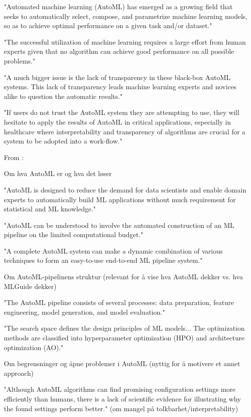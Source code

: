 "Automated machine learning (AutoML) has emerged as a growing field that seeks to automatically select, compose, and parametrize machine learning models, so as to achieve optimal performance on a given task and/or dataset."

"The successful utilization of machine learning requires a large effort from human experts given that no algorithm can achieve good performance on all possible problems."

"A much bigger issue is the lack of transparency in these black-box AutoML systems. This lack of transparency leads machine learning experts and novices alike to question the automatic results."

"If users do not trust the AutoML system they are attempting to use, they will hesitate to apply the results of AutoML in critical applications, especially in healthcare where interpretability and transparency of algorithms are crucial for a system to be adopted into a work-flow."

From \parencite{he2021automl_survey_state_of_the_art}:

Om hva AutoML er og hva det løser

"AutoML is designed to reduce the demand for data scientists and enable domain experts to automatically build ML applications without much requirement for statistical and ML knowledge."

"AutoML can be understood to involve the automated construction of an ML pipeline on the limited computational budget."

"A complete AutoML system can make a dynamic combination of various techniques to form an easy-to-use end-to-end ML pipeline system."

Om AutoML-pipelinens struktur (relevant for å vise hva AutoML dekker vs. hva MLGuide dekker)

"The AutoML pipeline consists of several processes: data preparation, feature engineering, model generation, and model evaluation."

"The search space defines the design principles of ML models... The optimization methods are classified into hyperparameter optimization (HPO) and architecture optimization (AO)."

Om begrensninger og åpne problemer i AutoML (nyttig for å motivere et annet approach)

"Although AutoML algorithms can find promising configuration settings more efficiently than humans, there is a lack of scientific evidence for illustrating why the found settings perform better." (om mangel på tolkbarhet/interpretability)

